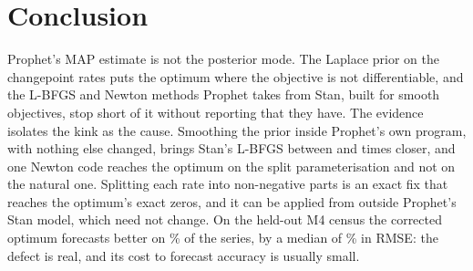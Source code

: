 \section{Conclusion}
\label{sec:conclusion}

Prophet's MAP estimate is not the posterior mode. The Laplace prior on the
changepoint rates puts the optimum where the objective is not differentiable, and the
L-BFGS and Newton methods Prophet takes from Stan, built for smooth objectives, stop
short of it without reporting that they have. The evidence isolates the kink as the
cause. Smoothing the prior inside Prophet's own program, with nothing else changed,
brings Stan's L-BFGS between \SmoothFactorLong{} and \SmoothFactorShort{} times
closer, and one Newton code reaches the optimum on the split parameterisation and not
on the natural one. Splitting each rate into non-negative parts is an exact fix that
reaches the optimum's exact zeros, and it can be applied from outside Prophet's Stan
model, which need not change. On the held-out M4 census the corrected optimum
forecasts better on \RmseWinRate\% of the series, by a median of \RmseAdvantage\% in
RMSE: the defect is real, and its cost to forecast accuracy is usually small.
